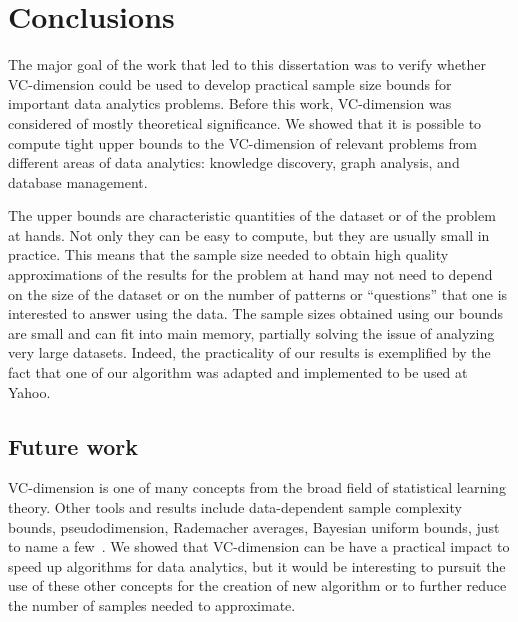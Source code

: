 \chapter{Conclusions}\label{ch:conclusions}

The major goal of the work that led to this dissertation was to verify whether
VC-dimension could be used to develop practical sample size bounds for important
data analytics problems. Before this work, VC-dimension was considered of mostly
theoretical significance. We showed that it is possible to compute tight upper
bounds to the VC-dimension of relevant problems from different areas of data
analytics: knowledge discovery, graph analysis, and database management. 

The upper bounds are characteristic quantities of the dataset or of the
problem at hands. Not only they can be easy to compute, but they are usually
small in practice. This means that the sample size needed to obtain high quality
approximations of the results for the problem at hand may not need to depend on
the size of the dataset or on the number of patterns or ``questions'' that one
is interested to answer using the data. The sample sizes obtained using our
bounds are small and can fit into main memory, partially solving the issue of
analyzing very large datasets. Indeed, the practicality of our results is
exemplified by the fact that one of our algorithm was adapted and implemented to
be used at Yahoo.


\section*{Future work} VC-dimension is one of many concepts from the broad
field of statistical learning theory. Other tools and results
include data-dependent sample complexity bounds, pseudodimension, Rademacher
averages, Bayesian uniform bounds, just to name a
few~\citep{BoucheronBL05,AnthonyB99,DevroyeGL96}. We showed that VC-dimension
can be have a practical impact to speed up algorithms for data analytics, but it
would be interesting to pursuit the use of these other concepts for the creation
of new algorithm or to further reduce the number of samples needed to
approximate. 

